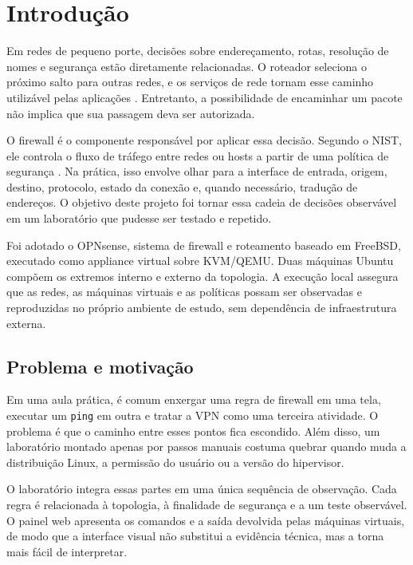 \documentclass[12pt,a4paper]{article}
\begin{document}
\section{Introdução}
Em redes de pequeno porte, decisões sobre endereçamento, rotas, resolução de
nomes e segurança estão diretamente relacionadas. O roteador seleciona o próximo
salto para outras redes, e os serviços de rede tornam esse caminho utilizável
pelas aplicações \citep{kurose2021,tanenbaum2021}. Entretanto, a possibilidade
de encaminhar um pacote não implica que sua passagem deva ser autorizada.

O firewall é o componente responsável por aplicar essa decisão. Segundo o NIST,
ele controla o fluxo de tráfego entre redes ou hosts a partir de uma política de segurança
\citep{nist80041}. Na prática, isso envolve olhar para a interface de entrada,
origem, destino, protocolo, estado da conexão e, quando necessário, tradução de
endereços. O objetivo deste projeto foi tornar essa cadeia de decisões observável
em um laboratório que pudesse ser testado e repetido.

Foi adotado o OPNsense, sistema de firewall e roteamento baseado em FreeBSD,
executado como appliance virtual sobre KVM/QEMU. Duas máquinas Ubuntu compõem os
extremos interno e externo da topologia. A execução local assegura que as redes,
as máquinas virtuais e as políticas possam ser observadas e reproduzidas no
próprio ambiente de estudo, sem dependência de infraestrutura externa.

\subsection{Problema e motivação}
Em uma aula prática, é comum enxergar uma regra de firewall em uma tela, executar
um \texttt{ping} em outra e tratar a VPN como uma terceira atividade. O problema
é que o caminho entre esses pontos fica escondido. Além disso, um laboratório
montado apenas por passos manuais costuma quebrar quando muda a distribuição
Linux, a permissão do usuário ou a versão do hipervisor.

O laboratório integra essas partes em uma única sequência de observação. Cada
regra é relacionada à topologia, à finalidade de segurança e a um teste
observável. O painel web apresenta os comandos e a saída devolvida pelas máquinas
virtuais, de modo que a interface visual não substitui a evidência técnica, mas
a torna mais fácil de interpretar.
\end{document}
